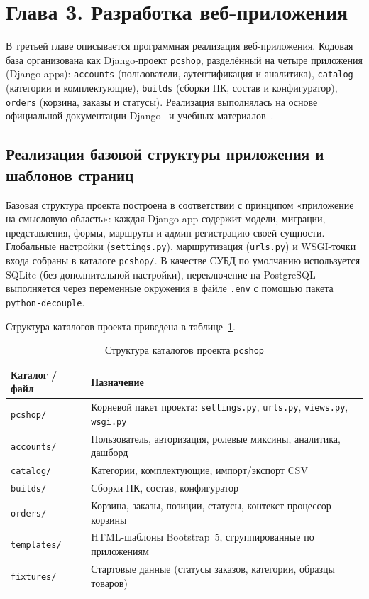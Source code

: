 \section*{Глава 3. Разработка веб-приложения}

В третьей главе описывается программная реализация веб-приложения. Кодовая база организована как Django-проект \texttt{pcshop}, разделённый на четыре приложения (Django apps): \texttt{accounts} (пользователи, аутентификация и аналитика), \texttt{catalog} (категории и комплектующие), \texttt{builds} (сборки ПК, состав и конфигуратор), \texttt{orders} (корзина, заказы и статусы). Реализация выполнялась на основе официальной документации Django~\cite{django_docs} и учебных материалов~\cite{hawkins2022django}.

\subsection{Реализация базовой структуры приложения и шаблонов страниц}

Базовая структура проекта построена в соответствии с принципом «приложение на смысловую область»: каждая Django-app содержит модели, миграции, представления, формы, маршруты и админ-регистрацию своей сущности. Глобальные настройки (\texttt{settings.py}), маршрутизация (\texttt{urls.py}) и WSGI-точки входа собраны в каталоге \texttt{pcshop/}. В качестве СУБД по умолчанию используется SQLite (без дополнительной настройки), переключение на PostgreSQL выполняется через переменные окружения в файле \texttt{.env} с помощью пакета \texttt{python-decouple}.

Структура каталогов проекта приведена в таблице~\ref{tab:project-layout}.

\begin{table}[ht!]
\caption{Структура каталогов проекта \texttt{pcshop}}
\label{tab:project-layout}
\small
\begin{tabularx}{\textwidth}{|>{\RaggedRight\arraybackslash}p{}|>{\RaggedRight\arraybackslash}X|}
\hline
\textbf{Каталог / файл} & \textbf{Назначение} \\ \hline
\texttt{pcshop/} & Корневой пакет проекта: \texttt{settings.py}, \texttt{urls.py}, \texttt{views.py}, \texttt{wsgi.py} \\ \hline
\texttt{accounts/} & Пользователь, авторизация, ролевые миксины, аналитика, дашборд \\ \hline
\texttt{catalog/} & Категории, комплектующие, импорт/экспорт CSV \\ \hline
\texttt{builds/} & Сборки ПК, состав, конфигуратор \\ \hline
\texttt{orders/} & Корзина, заказы, позиции, статусы, контекст-процессор корзины \\ \hline
\texttt{templates/} & HTML-шаблоны Bootstrap~5, сгруппированные по приложениям \\ \hline
\texttt{fixtures/} & Стартовые данные (статусы заказов, категории, образцы товаров) \\ \hline
\end{tabularx}
\end{table}

